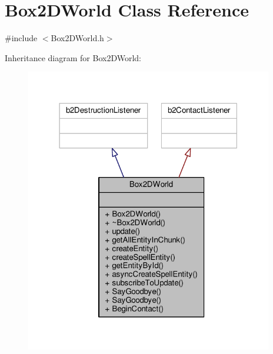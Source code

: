 \hypertarget{class_box2_d_world}{\section{Box2\-D\-World Class Reference}
\label{class_box2_d_world}
}


{\ttfamily \#include $<$Box2\-D\-World.\-h$>$}



Inheritance diagram for Box2\-D\-World\-:
\nopagebreak
\begin{figure}[H]
\begin{center}
\leavevmode
\includegraphics[width=306pt]{class_box2_d_world__inherit__graph}
\end{center}
\end{figure}


